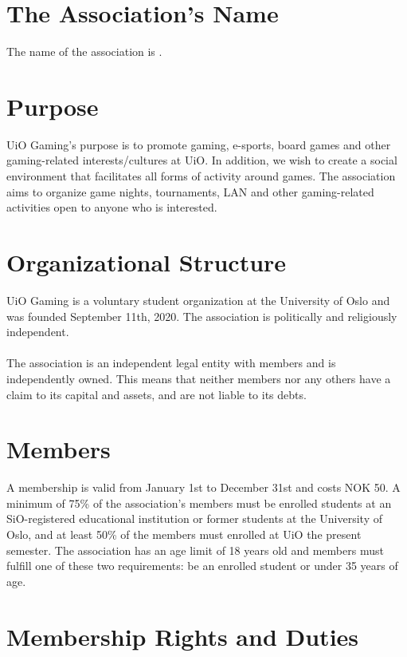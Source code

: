 \documentclass[12pt,a4paper,norsk]{article}
\begin{document}
\section{The Association's Name}

The name of the association is .


\section{Purpose}

UiO Gaming's purpose is to promote gaming, e-sports, board games and other gaming-related interests/cultures at UiO. In addition, we wish to create a social environment that facilitates all forms of activity around games. The association aims to organize game nights, tournaments, LAN and other gaming-related activities open to anyone who is interested.



\section{Organizational Structure}

UiO Gaming is a voluntary student organization at the University of Oslo and was founded September 11th, 2020. The association is politically and religiously independent.
\\
\\
The association is an independent legal entity with members and is independently owned. This means that neither members nor any others have a claim to its capital and assets, and are not liable to its debts.



\section{Members}

A membership is valid from January 1st to December 31st and costs NOK 50. A minimum of 75\% of the association's members must be enrolled students at an SiO-registered educational institution or former students at the University of Oslo, and at least 50\% of the members must enrolled at UiO the present semester. The association has an age limit of 18 years old and members must fulfill one of these two requirements: be an enrolled student or under 35 years of age.



\section{Membership Rights and Duties}
\end{document}
